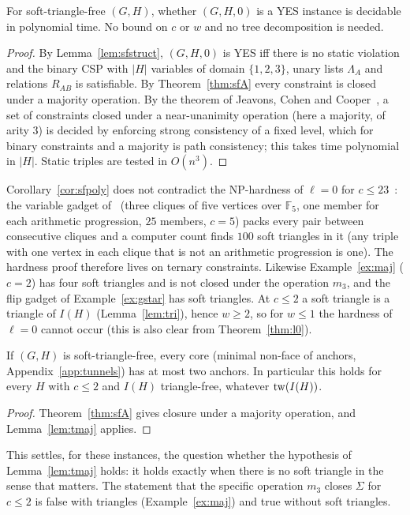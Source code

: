 \begin{corollary}\label{cor:sfpoly}
For soft-triangle-free $(G,H)$, whether $(G,H,0)$ is a YES instance is decidable in polynomial time. No bound on $c$ or $w$ and no tree decomposition is needed.
\end{corollary}
\begin{proof}
By Lemma~\ref{lem:sfstruct}, $(G,H,0)$ is YES iff there is no static violation and the binary CSP with $|H|$ variables of domain $\{1,2,3\}$, unary lists $\Lambda_A$ and relations $R_{AB}$ is satisfiable. By Theorem~\ref{thm:sfA} every constraint is closed under a majority operation. By the theorem of Jeavons, Cohen and Cooper~\cite{JCC98}, a set of constraints closed under a near-unanimity operation (here a majority, of arity $3$) is decided by enforcing strong consistency of a fixed level, which for binary constraints and a majority is path consistency; this takes time polynomial in $|H|$. Static triples are tested in $O(n^3)$.
\end{proof}
\begin{remark}[No conflict with the hardness of $\ell=0$]\label{rem:sfLPS}
Corollary~\ref{cor:sfpoly} does not contradict the NP-hardness of $\ell=0$ for $c\le23$~\cite{LPS23}: the variable gadget of~\cite[Sect.~4.1.1]{LPS23} (three cliques of five vertices over $\mathbb F_5$, one member for each arithmetic progression, $25$ members, $c=5$) packs every pair between consecutive cliques and a computer count finds $100$ soft triangles in it (any triple with one vertex in each clique that is not an arithmetic progression is one). The hardness proof therefore lives on ternary constraints. Likewise Example~\ref{ex:maj} ($c=2$) has four soft triangles and is not closed under the operation $m_3$, and the flip gadget of Example~\ref{ex:gstar} has soft triangles. At $c\le2$ a soft triangle is a triangle of $I(H)$ (Lemma~\ref{lem:tri}), hence $w\ge2$, so for $w\le1$ the hardness of $\ell=0$ cannot occur (this is also clear from Theorem~\ref{thm:l0}).
\end{remark}

\begin{corollary}\label{cor:sfcore}
If $(G,H)$ is soft-triangle-free, every core (minimal non-face of anchors, Appendix~\ref{app:tunnels}) has at most two anchors. In particular this holds for every $H$ with $c\le2$ and $I(H)$ triangle-free, whatever $\mathrm{tw}(I(H))$.
\end{corollary}
\begin{proof}
Theorem~\ref{thm:sfA} gives closure under a majority operation, and Lemma~\ref{lem:tmaj} applies.
\end{proof}
This settles, for these instances, the question whether the hypothesis of Lemma~\ref{lem:tmaj} holds: it holds exactly when there is no soft triangle in the sense that matters. The statement that the specific operation $m_3$ closes $\Sigma$ for $c\le2$ is false with triangles (Example~\ref{ex:maj}) and true without soft triangles.

